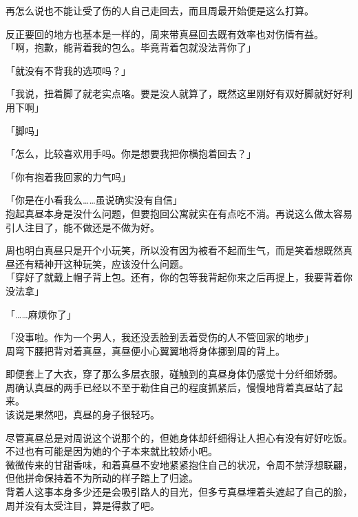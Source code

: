 再怎么说也不能让受了伤的人自己走回去，而且周最开始便是这么打算。

反正要回的地方也基本是一样的，周来带真昼回去既有效率也对伤情有益。\\

「啊，抱歉，能背着我的包么。毕竟背着包就没法背你了」

「就没有不背我的选项吗？」

「我说，扭着脚了就老实点咯。要是没人就算了，既然这里刚好有双好脚就好好利用下啊」

「脚吗」

「怎么，比较喜欢用手吗。你是想要我把你横抱着回去？」

「你有抱着我回家的力气吗」

「你是在小看我么……虽说确实没有自信」\\

抱起真昼本身是没什么问题，但要抱回公寓就实在有点吃不消。再说这么做太容易引人注目了，能不做还是不做为好。

周也明白真昼只是开个小玩笑，所以没有因为被看不起而生气，而是笑着想既然真昼还有精神开这种玩笑，应该没什么问题。\\

「穿好了就戴上帽子背上包。还有，你的包等我背起你来之后再提上，我要背着你没法拿」

「……麻烦你了」

「没事啦。作为一个男人，我还没丢脸到丢着受伤的人不管回家的地步」\\

周弯下腰把背对着真昼，真昼便小心翼翼地将身体挪到周的背上。

即便套上了大衣，穿了那么多层衣服，碰触到的真昼身体仍感觉十分纤细娇弱。\\

周确认真昼的两手已经以不至于勒住自己的程度抓紧后，慢慢地背着真昼站了起来。\\

该说是果然吧，真昼的身子很轻巧。

尽管真昼总是对周说这个说那个的，但她身体却纤细得让人担心有没有好好吃饭。不过也有可能是因为她的个子本来就比较娇小吧。\\

微微传来的甘甜香味，和着真昼不安地紧紧抱住自己的状况，令周不禁浮想联翩，但他拼命保持着不为所动的样子踏上了归途。\\

背着人这事本身多少还是会吸引路人的目光，但多亏真昼埋着头遮起了自己的脸，周并没有太受注目，算是得救了吧。\\

